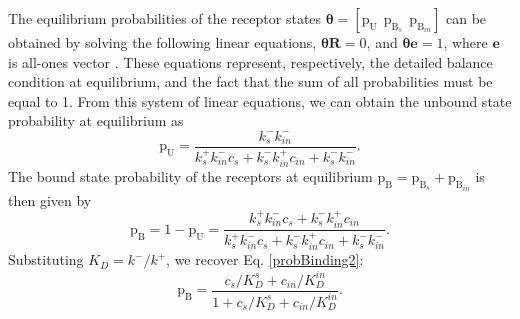 \documentclass[twocolumn]{IEEEtran}
\newcommand{\p}{\mathrm{p}}
\newcommand{\B}{\mathrm{B}}
\newcommand{\U}{\mathrm{U}}
\begin{document}
The equilibrium probabilities of the receptor states $\bm{\theta} = [\p_\U ~~ \p_{\B_s} ~~ \p_{\B_{in}}]$ can be obtained by solving the following linear equations, $\bm{\theta} \bm{R} = 0$, and $\bm{\theta} \bm{e} = 1$, where $\bm{e}$ is all-ones vector \cite{whitt2006continuous}. These equations represent, respectively, the detailed balance condition at equilibrium, and the fact that the sum of all probabilities must be equal to 1. From this system of linear equations, we can obtain the unbound state probability at equilibrium as 
	\[
	\p_\U  = \frac{k_s^- k_{in}^-}{k_s^+ k_{in}^- c_s + k_s^- k_{in}^+ c_{in} + k_s^- k_{in}^-}.
	\]
	The bound state probability of the receptors at equilibrium $\p_\B = \p_{\B_s} + \p_{\B_{in}}$ is then given by
	\[
	\p_\B  = 1 - \p_\U = \frac{k_s^+ k_{in}^- c_s + k_s^- k_{in}^+ c_{in}}{k_s^+ k_{in}^- c_{s} + k_s^- k_{in}^+ c_{in} + k_s^- k_{in}^-}. 
	\]
	Substituting $K_D = k^-/k^+$, we recover Eq. \eqref{probBinding2}:
	\[
	\p_\B = \frac{c_s/K_D^s + c_{in}/K_D^{in}  }{1 + c_s/K_D^s + c_{in}/K_D^{in}}.
	\]

\end{document}
